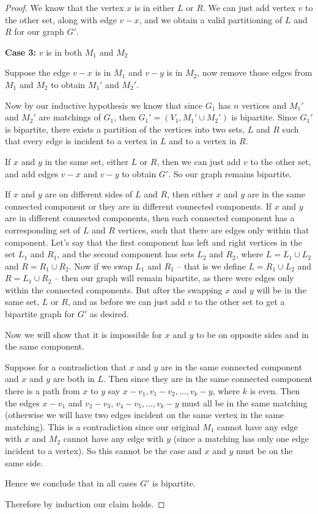 \documentclass[12pt,twoside]{article}
\begin{document}
\begin{problem}{15}
{\begin{proof}
We know that the vertex $x$ is in either $L$ or $R$. We can just add vertex $v$ to the other set, along with edge $v-x$, and we obtain a valid partitioning of $L$ and $R$ for our graph $G'$. 



\textbf{Case 3:} $v$ is in both $M_1$ and $M_2$

Suppose the edge $v-x$ is in $M_1$ and $v-y$ is in $M_2$, now remove  those edges from $M_1$ and $M_2$ to obtain $M_1'$ and $M_2'$.

Now by our inductive hypothesis we know that since $G_1$ has $n$ vertices and $M_1'$ and $M_2'$ are matchings of $G_1$, then $G_1'=(V_1, M_1' \cup M_2')$ is bipartite. Since $G_1'$ is bipartite, there exists a partition of the vertices into two sets, $L$ and $R$ such that every edge is incident to a vertex in $L$ and to a vertex in $R$. 

If $x$ and $y$ in the same set, either $L$ or $R$, then we can just add $v$ to the other set, and add edges $v-x$ and $v-y$ to obtain $G'$. So our graph remains bipartite. 

If $x$ and $y$ are on different sides of $L$ and $R$, then either $x$ and $y$ are in the same connected component or they are in different connected components. If $x$ and $y$ are in different connected components, then each connected component has a corresponding set of $L$ and $R$ vertices, such that there are edges only within that component. Let's say that the first component has left and right vertices in the set $L_1$ and $R_1$, and the second component has sets $L_2$ and $R_2$, where $L=L_1 \cup L_2$ and $R=R_1 \cup R_2$. Now if we swap $L_1$ and $R_1$ -- that is we define $L=R_1 \cup L_2$ and $R=L_1 \cup R_2$ -- then our graph will remain bipartite, as there were edges only within the connected components. But after the swapping $x$ and $y$ will be in the same set, $L$ or $R$, and as before we can just add $v$ to the other set to get a bipartite graph for $G'$ as desired. 

Now we will show that it is impossible for $x$ and $y$ to be on opposite sides and in the same component. 

Suppose for a contradiction that $x$ and $y$ are in the same connected component and $x$ and $y$ are both in $L$. Then since they are in the same connected component there is a path from $x$ to $y$ say $x-v_1, v_1-v_2, \ldots, v_k-y$, where $k$ is even. Then the edges $x-v_1$ and $v_2-v_3$, $v_4-v_5, \ldots, v_k-y$ must all be in the same matching (otherwise we will have two edges incident on the same vertex in the
same matching). This is a contradiction since our original $M_1$ cannot have any edge with $x$ and $M_2$ cannot have any edge with $y$ (since a matching has only one edge incident to a vertex). So this cannot be the case and $x$ and $y$ must be on the same side.

Hence we conclude that in all cases $G'$ is bipartite.

Therefore by induction our claim holds.
\end{proof}

}
\end{problem}
\end{document}
